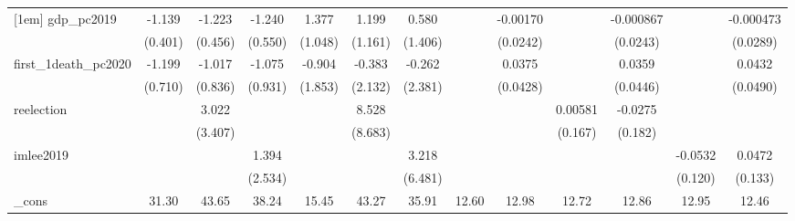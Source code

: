 {\begin{tabular}{l*{12}{c}}
[1em]
gdp\_pc2019  &      -1.139\sym{**} &      -1.223\sym{**} &      -1.240\sym{**} &       1.377         &       1.199         &       0.580         &                     &    -0.00170         &                     &   -0.000867         &                     &   -0.000473         \\
            &     (0.401)         &     (0.456)         &     (0.550)         &     (1.048)         &     (1.161)         &     (1.406)         &                     &    (0.0242)         &                     &    (0.0243)         &                     &    (0.0289)         \\
[1em]
first\_1death\_pc2020&      -1.199         &      -1.017         &      -1.075         &      -0.904         &      -0.383         &      -0.262         &                     &      0.0375         &                     &      0.0359         &                     &      0.0432         \\
            &     (0.710)         &     (0.836)         &     (0.931)         &     (1.853)         &     (2.132)         &     (2.381)         &                     &    (0.0428)         &                     &    (0.0446)         &                     &    (0.0490)         \\
[1em]
reelection  &                     &       3.022         &                     &                     &       8.528         &                     &                     &                     &     0.00581         &     -0.0275         &                     &                     \\
            &                     &     (3.407)         &                     &                     &     (8.683)         &                     &                     &                     &     (0.167)         &     (0.182)         &                     &                     \\
[1em]
imlee2019   &                     &                     &       1.394         &                     &                     &       3.218         &                     &                     &                     &                     &     -0.0532         &      0.0472         \\
            &                     &                     &     (2.534)         &                     &                     &     (6.481)         &                     &                     &                     &                     &     (0.120)         &     (0.133)         \\
[1em]
\_cons      &       31.30\sym{*}  &       43.65\sym{**} &       38.24         &       15.45         &       43.27         &       35.91         &       12.60\sym{***}&       12.98\sym{***}&       12.72\sym{***}&       12.86\sym{***}&       12.95\sym{***}&       12.46\sym{***}\\

\end{tabular}}
